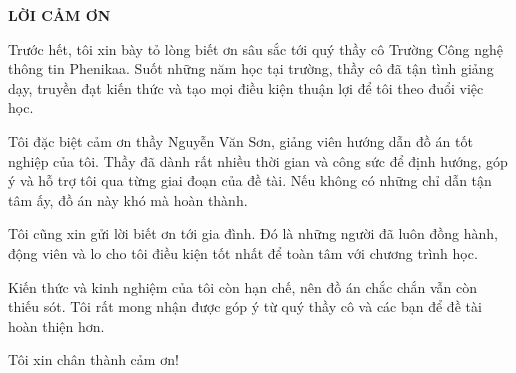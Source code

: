 \fontsize{13pt}{22.5pt}\selectfont
\begin{center}
    {\large\bfseries LỜI CẢM ƠN}
\end{center}

\vspace{0.5cm}

\indent Trước hết, tôi xin bày tỏ lòng biết ơn sâu sắc tới quý thầy cô Trường Công nghệ
thông tin Phenikaa. Suốt những năm học tại trường, thầy cô đã tận tình giảng dạy,
truyền đạt kiến thức và tạo mọi điều kiện thuận lợi để tôi theo đuổi việc học.

\indent Tôi đặc biệt cảm ơn thầy Nguyễn Văn Sơn, giảng viên hướng dẫn đồ án tốt nghiệp
của tôi. Thầy đã dành rất nhiều thời gian và công sức để định hướng, góp ý và hỗ trợ tôi
qua từng giai đoạn của đề tài. Nếu không có những chỉ dẫn tận tâm ấy, đồ án này khó mà
hoàn thành.

\indent Tôi cũng xin gửi lời biết ơn tới gia đình. Đó là những người đã luôn đồng hành,
động viên và lo cho tôi điều kiện tốt nhất để toàn tâm với chương trình học.

\indent Kiến thức và kinh nghiệm của tôi còn hạn chế, nên đồ án chắc chắn vẫn còn thiếu
sót. Tôi rất mong nhận được góp ý từ quý thầy cô và các bạn để đề tài hoàn thiện hơn.

\indent Tôi xin chân thành cảm ơn!